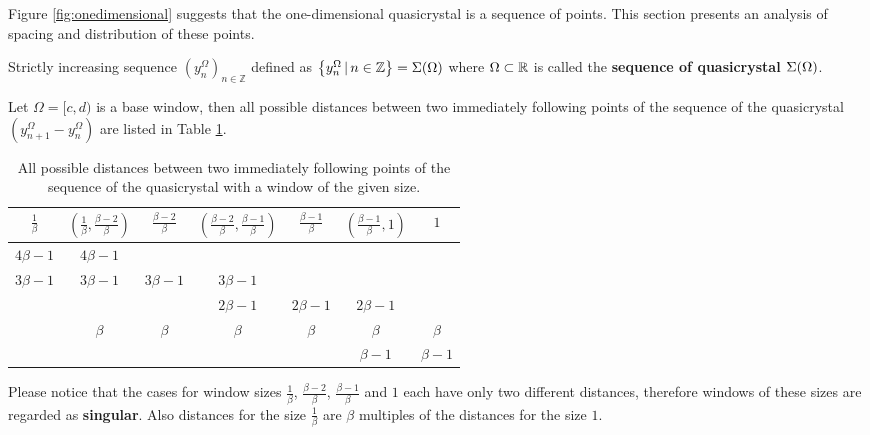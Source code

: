\documentclass[text.tex]{subfiles}
\begin{document}
Figure \ref{fig:onedimensional} suggests that the one-dimensional quasicrystal is a sequence of points. This section presents an analysis of spacing and distribution of these points.

\begin{definition}
Strictly increasing sequence $(y_n^\Omega)_{n\in \mathbb{Z}}$ defined as $\left\{y_n^\Omega\,|\, n\in\mathbb{Z} \right\} = \Sigma(\Omega)$ where $\Omega \subset \mathbb{R}$ is called the \textbf{sequence of quasicrystal $\Sigma(\Omega)$}.
\end{definition}

\begin{theorem}
\label{the:spaces:sum}
Let $\Omega = [c,d)$ is a base window, then all possible distances between two immediately following points of the sequence of  the quasicrystal $\left(y_{n+1}^\Omega-y_n^\Omega\right)$ are listed in Table \ref{table:spaces}.
\begin{table}[h]
\begin{center}
\begin{tabular}{ccccccc}
	\toprule
		$\frac{1}{\beta}$	&	$\left( \frac{1}{\beta}, \frac{\beta - 2}{\beta} \right)$	&	$\frac{\beta-2}{\beta}$	&	$\left( \frac{\beta-2}{\beta}, \frac{\beta-1}{\beta} \right)$	&	$\frac{\beta-1}{\beta}$	&	$\left( \frac{\beta-1}{\beta}, 1 \right)$	&	$1$\\
	\midrule
		$4\beta-1$ 	&	$4\beta-1$	&				&				&				&				&			 	\\ 
		$3\beta-1$	&	$3\beta-1$	&	$3\beta-1$	&	$3\beta-1$	&				&				&			 	\\
					&				&				&	$2\beta-1$	&	$2\beta-1$	&	$2\beta-1$	&				\\
					&	$\beta$		&	$\beta$		&	$\beta$		&	$\beta$		&	$\beta$		&	$\beta$		\\
					&				&				&				&				&	$\beta-1$	&	$\beta-1$	\\
	\bottomrule
\end{tabular}
\caption{All possible distances between two immediately following points of the sequence of the quasicrystal with a window of the given size.}
\label{table:spaces}
\end{center}
\end{table}
\end{theorem}

\begin{remark}
Please notice that the cases for window sizes $\frac{1}{\beta}$, $\frac{\beta-2}{\beta}$, $\frac{\beta-1}{\beta}$ and $1$ each have only two different distances, therefore windows of these sizes are regarded as \textbf{singular}. Also distances for the size $\frac{1}{\beta}$ are $\beta$ multiples of the distances for the size $1$.
\end{remark}
\end{document}
